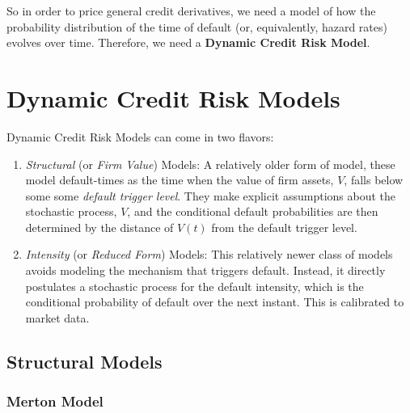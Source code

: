 \documentclass[a4paper,12pt]{scrartcl}
\begin{document}
So in order
to price general credit derivatives, we need a model of how the
probability distribution of the time of default (or, equivalently,
hazard rates) evolves over time. Therefore, we need a 
\textbf{Dynamic Credit Risk Model}. 

\newpage
\section{Dynamic Credit Risk Models}

Dynamic Credit Risk Models can come in two flavors:
\begin{enumerate}
   \item {\sl Structural} (or {\sl Firm Value}) Models: A relatively
      older form of model, these model default-times as the time 
      when the value of firm assets, $V$, falls below some
      some \emph{default trigger level}. They make explicit assumptions
      about the stochastic process, $V$, and the conditional default
      probabilities are then determined by the distance of $V(t)$ from
      the default trigger level.
   \item {\sl Intensity} (or {\sl Reduced Form}) Models: This relatively
      newer class of models avoids modeling the mechanism that
      triggers default.  Instead, it directly postulates a stochastic 
      process for the default intensity, which is the conditional 
      probability of default over the next instant. This is 
      calibrated to market data.
\end{enumerate}

\subsection{Structural Models}

\subsubsection{Merton Model}
\end{document}

